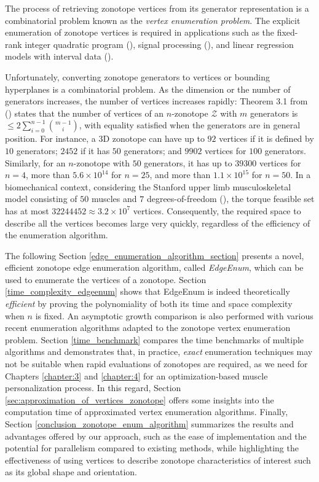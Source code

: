 The process of retrieving zonotope vertices from its generator representation is a combinatorial problem known as the \emph{vertex enumeration problem}. The explicit enumeration of zonotope vertices is required in applications such as the fixed-rank integer quadratic program (\cite{ferrezSolvingFixedRank2005a}), signal processing (\cite{markopoulosOptimalAlgorithmsL_12014}), and linear regression models with interval data (\cite{cernyPossibilisticApproachLinear2013}).

Unfortunately, converting zonotope generators to vertices or bounding hyperplanes is a combinatorial problem. As the dimension or the number of generators increases, the number of vertices increases rapidly: Theorem 3.1 from (\cite{ferrezSolvingFixedRank2005a}) states that the number of vertices of an $n$-zonotope $\mathcal{Z}$ with $m$ generators is $\leq 2 \sum_{i=0}^{n-1} \binom{m-1}{i}$, with equality satisfied when the generators are in general position. For instance, a 3D zonotope can have up to $92$ vertices if it is defined by $10$ generators; $2452$ if it has $50$ generators; and $9902$ vertices for $100$ generators. Similarly, for an $n$-zonotope with $50$ generators, it has up to $39300$ vertices for $n=4$, more than $5.6\times 10^{14}$ for $n=25$, and more than $1.1\times 10^{15}$ for $n=50$. In a biomechanical context, considering the Stanford upper limb musculoskeletal model consisting of $50$ muscles and $7$ degrees-of-freedom (\cite{holzbaurModelUpperExtremity2005}), the torque feasible set has at most $32244452\approx 3.2\times 10^{7}$ vertices. Consequently, the required space to describe all the vertices becomes large very quickly, regardless of the efficiency of the enumeration algorithm. 

The following Section \ref{edge_enumeration_algorithm_section} presents a novel, efficient zonotope edge enumeration algorithm, called \emph{EdgeEnum}, which can be used to enumerate the vertices of a zonotope. Section \ref{time_complexity_edgeenum} shows that EdgeEnum is indeed theoretically \emph{efficient} by proving the polynomiality of both its time and space complexity when $n$ is fixed. An asymptotic growth comparison is also performed with various recent enumeration algorithms adapted to the zonotope vertex enumeration problem. Section \ref{time_benchmark} compares the time benchmarks of multiple algorithms and demonstrates that, in practice, \emph{exact} enumeration techniques may not be suitable when rapid evaluations of zonotopes are required, as we need for Chapters \ref{chapter:3} and \ref{chapter:4} for an optimization-based muscle personalization process. In this regard, Section \ref{sec:approximation_of_vertices_zonotope} offers some insights into the computation time of approximated vertex enumeration algorithms. Finally, Section \ref{conclusion_zonotope_enum_algorithm} summarizes the results and advantages offered by our approach, such as the ease of implementation and the potential for parallelism compared to existing methods, while highlighting the effectiveness of using vertices to describe zonotope characteristics of interest such as its global shape and orientation.

